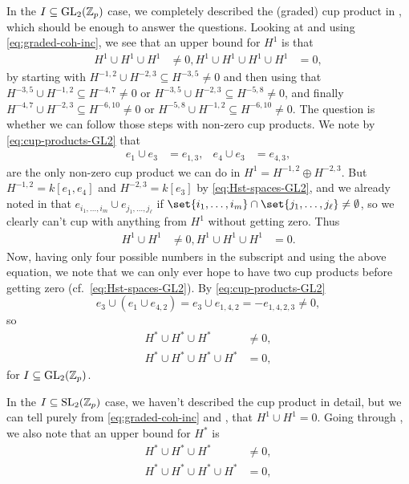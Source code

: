 In the $I \subseteq \operatorname{GL}_{2}(\mathbb{Z}_{p})$ case, we completely described the (graded) cup product in , which should be enough to answer the questions. Looking at  and using \eqref{eq:graded-coh-inc}, we see that an upper bound for $H^{1}$ is that
\begin{align*}
  H^{1} \cup H^{1} \cup H^{1} &\neq 0,
  H^{1} \cup H^{1} \cup H^{1} \cup H^{1} &= 0,
\end{align*}
by starting with $H^{-1,2} \cup H^{-2,3} \subseteq H^{-3,5} \neq 0$ and then using that $H^{-3,5} \cup H^{-1,2} \subseteq H^{-4,7} \neq 0$ or $H^{-3,5} \cup H^{-2,3} \subseteq H^{-5,8} \neq 0$, and finally  $H^{-4,7} \cup H^{-2,3} \subseteq H^{-6,10} \neq 0$ or $H^{-5,8} \cup H^{-1,2} \subseteq H^{-6,10}\neq0$. The question is whether we can follow those steps with non-zero cup products. We note by \eqref{eq:cup-products-GL2} that
\begin{align*}
  e_{1} \cup e_{3} &= e_{1,3}, & e_{4} \cup e_{3} &= e_{4,3},
\end{align*}
are the only non-zero cup product we can do in $H^{1} = H^{-1,2} \oplus H^{-2,3}$. But $H^{-1,2} = k[e_{1},e_{4}]$ and $H^{-2,3} = k[e_{3}]$ by \eqref{eq:Hst-spaces-GL2}, and we already noted in  that $e_{i_{1},\dotsc,i_{m}} \cup e_{j_{1},\dotsc,j_{\ell}}$ if $\set{i_{1},\dotsc,i_{m}} \cap \set{j_{1},\dotsc,j_{\ell}} \neq \emptyset$, so we clearly can't cup with anything from $H^{1}$ without getting zero. Thus
\begin{align*}
  H^{1} \cup H^{1} &\neq 0,
  H^{1} \cup H^{1} \cup H^{1} &= 0.
\end{align*}
Now, having only four possible numbers in the subscript and using the above equation, we note that we can only ever hope to have two cup products before getting zero (cf.\ \eqref{eq:Hst-spaces-GL2}). By \eqref{eq:cup-products-GL2}
\begin{equation*}
  e_{3} \cup (e_{1} \cup e_{4,2}) = e_{3} \cup e_{1,4,2} = -e_{1,4,2,3} \neq 0,
\end{equation*}
so
\begin{align*}
  H^{*} \cup H^{*} \cup H^{*} &\neq 0, \\
  H^{*} \cup H^{*} \cup H^{*} \cup H^{*} &= 0,
\end{align*}
for $I \subseteq \operatorname{GL}_{2}(\mathbb{Z}_{p})$.

In the $I \subseteq \operatorname{SL}_{2}(\mathbb{Z}_{p})$ case, we haven't described the cup product in detail, but we can tell purely from \eqref{eq:graded-coh-inc} and , that $H^{1} \cup H^{1} = 0$. Going through , we also note that an upper bound for $H^{*}$ is
\begin{align*}
  H^{*} \cup H^{*} \cup H^{*} &\neq 0, \\
  H^{*} \cup H^{*} \cup H^{*} \cup H^{*} &= 0,
\end{align*}

